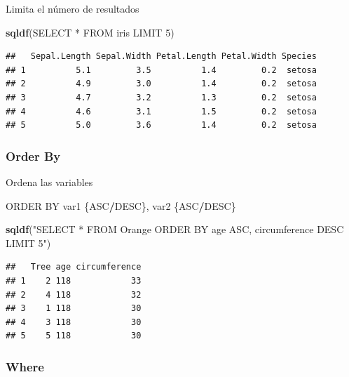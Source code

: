 \documentclass[
]{book}
\newenvironment{Shaded}{\begin{snugshade}}{\end{snugshade}}
\newcommand{\FunctionTok}[1]{\textcolor[rgb]{0.13,0.29,0.53}{\textbf{#1}}}
\newcommand{\NormalTok}[1]{#1}
\newcommand{\SpecialCharTok}[1]{\textcolor[rgb]{0.81,0.36,0.00}{\textbf{#1}}}
\newcommand{\StringTok}[1]{\textcolor[rgb]{0.31,0.60,0.02}{#1}}
\begin{document}
Limita el número de resultados

\begin{Shaded}
\begin{Highlighting}[]
\FunctionTok{sqldf}\NormalTok{(}\StringTok{\textquotesingle{}SELECT * FROM iris LIMIT 5\textquotesingle{}}\NormalTok{)}
\end{Highlighting}
\end{Shaded}

\begin{verbatim}
##   Sepal.Length Sepal.Width Petal.Length Petal.Width Species
## 1          5.1         3.5          1.4         0.2  setosa
## 2          4.9         3.0          1.4         0.2  setosa
## 3          4.7         3.2          1.3         0.2  setosa
## 4          4.6         3.1          1.5         0.2  setosa
## 5          5.0         3.6          1.4         0.2  setosa
\end{verbatim}

\subsubsection{Order By}\label{order-by}

Ordena las variables

\begin{Shaded}
\begin{Highlighting}[]
\NormalTok{ORDER BY var1 \{ASC}\SpecialCharTok{/}\NormalTok{DESC\}, var2 \{ASC}\SpecialCharTok{/}\NormalTok{DESC\}}
\end{Highlighting}
\end{Shaded}

\begin{Shaded}
\begin{Highlighting}[]
\FunctionTok{sqldf}\NormalTok{(}\StringTok{"SELECT * FROM Orange ORDER BY age ASC, circumference DESC LIMIT 5"}\NormalTok{)}
\end{Highlighting}
\end{Shaded}

\begin{verbatim}
##   Tree age circumference
## 1    2 118            33
## 2    4 118            32
## 3    1 118            30
## 4    3 118            30
## 5    5 118            30
\end{verbatim}

\subsubsection{Where}\label{where}
\end{document}
